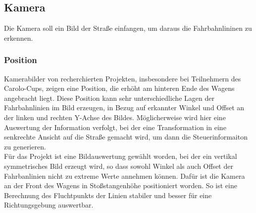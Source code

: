 \subsection{Kamera}
Die Kamera soll ein Bild der Straße einfangen, um daraus die Fahrbahnlininen zu
erkennen. 
\subsubsection{Position}
Kamerabilder von recherchierten Projekten, insbesondere bei
Teilnehmern des Carolo-Cups, zeigen eine Position, die 
erhöht am hinteren Ende des Wagens angebracht liegt. Diese Position kann sehr
unterschiedliche Lagen der Fahrbahnlinien im Bild erzeugen, in Bezug auf
erkannter Winkel und Offset an der linken und rechten Y-Achse des Bildes.
Möglicherweise wird hier eine Auswertung der Information verfolgt, bei der eine
Transformation in eine senkrechte Ansicht auf die Straße gemacht wird, um dann
die Steuerinformaiton zu generieren.\\
Für das Projekt ist eine Bildauswertung gewählt worden, bei der ein vertikal
symmetrisches Bild erzeugt wird, so dass sowohl Winkel als auch Offset der
Fahrbanlinien nicht zu extreme Werte annehmen können. Dafür ist die Kamera an
der Front des Wagens in Stoßstangenhöhe positioniert worden. So ist eine
Berechnung des Fluchtpunkts der Linien stabiler und besser für eine
Richtungsgebung auswertbar.\\
